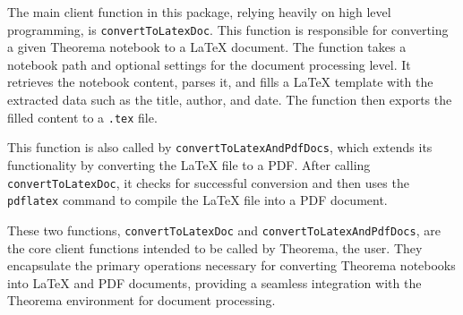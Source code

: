 The main client function in this package, relying heavily on high level programming, is \texttt{convertToLatexDoc}. This function is responsible for converting a given Theorema notebook to a LaTeX document. The function takes a notebook path and optional settings for the document processing level. It retrieves the notebook content, parses it, and fills a LaTeX template with the extracted data such as the title, author, and date. The function then exports the filled content to a \texttt{.tex} file. 

This function is also called by \texttt{convertToLatexAndPdfDocs}, which extends its functionality by converting the LaTeX file to a PDF. After calling \texttt{convertToLatexDoc}, it checks for successful conversion and then uses the \texttt{pdflatex} command to compile the LaTeX file into a PDF document.

These two functions, \texttt{convertToLatexDoc} and \texttt{convertToLatexAndPdfDocs}, are the core client functions intended to be called by Theorema, the user. They encapsulate the primary operations necessary for converting Theorema notebooks into LaTeX and PDF documents, providing a seamless integration with the Theorema environment for document processing.

